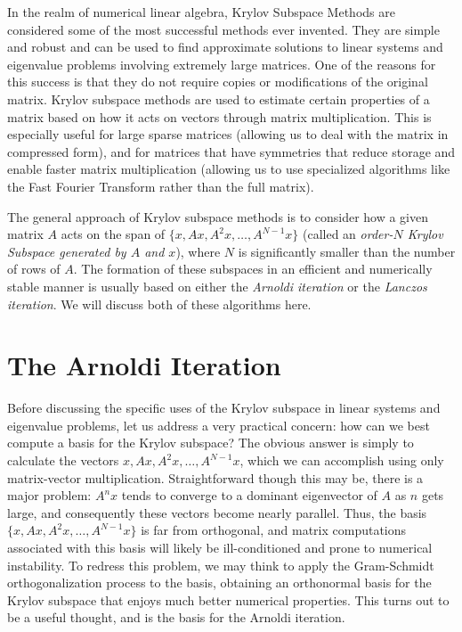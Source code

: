 \label{lab:kry_arnoldi}


In the realm of numerical linear algebra, Krylov Subspace Methods are considered some of the most successful  methods ever invented.
They are simple and robust and can be used to find approximate solutions to linear systems and eigenvalue problems involving extremely
large matrices.
One of the reasons for this success is that they do not require copies or modifications of the original
matrix.
Krylov subspace methods are used to estimate certain properties of a matrix based on how it acts on vectors through matrix multiplication.
This is especially useful for large sparse matrices (allowing us to deal with the matrix in compressed form),
and for matrices that have symmetries that reduce storage and enable faster matrix multiplication (allowing us to use
specialized algorithms like the Fast Fourier Transform rather than the full matrix).

The general approach of Krylov subspace methods is to consider how a given matrix $A$ acts on the span of
$\{ x, Ax, A^2 x, \ldots, A^{N-1} x \}$ (called an \emph{order-$N$ Krylov Subspace generated by $A$ and $x$}), where $N$ is significantly
smaller than the number of rows of $A$.
The formation of these subspaces in an efficient and numerically stable manner is usually based on either the \emph{Arnoldi
iteration} or the \emph{Lanczos iteration}. We will discuss both of these algorithms here.

\section*{The Arnoldi Iteration}

Before discussing the specific uses of the Krylov subspace in linear systems and eigenvalue problems, let us address a very
practical concern: how can we best compute a basis for the Krylov subspace? The obvious answer is simply to
calculate the vectors $x, Ax, A^2x, \ldots, A^{N-1} x$, which we can accomplish using only matrix-vector multiplication.
Straightforward though this may be, there is a major problem: $A^n x$ tends to converge to a dominant eigenvector of $A$
as $n$ gets large, and consequently these vectors become nearly parallel. Thus, the basis $\{x, Ax, A^2x, \ldots, A^{N-1} x\}$
is far from orthogonal, and matrix computations associated with this basis will likely be ill-conditioned and prone to
numerical instability. To redress this problem, we may think to apply the Gram-Schmidt orthogonalization process to the
basis, obtaining an orthonormal basis for the Krylov subspace that enjoys much better numerical properties. This turns out to
be a useful thought, and is the basis for the Arnoldi iteration.

